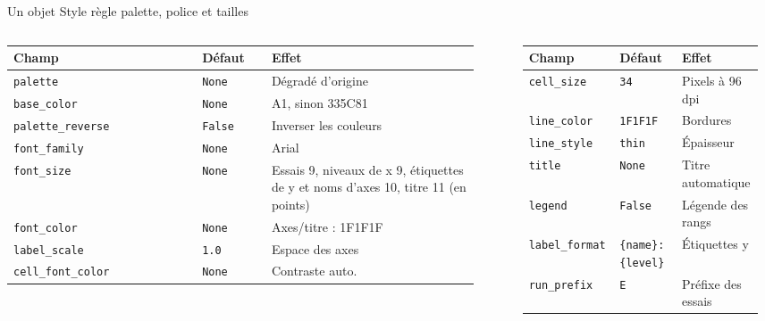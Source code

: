 \begin{frame}[t]{Un objet Style règle palette, police et tailles}
\vfill
{\footnotesize\setlength{\tabcolsep}{2.5pt}
\begin{columns}[T,totalwidth=1.05\textwidth]
\begin{column}{0.49\textwidth}
\begin{tabular}{@{}>{\raggedright\arraybackslash}p{0.38\linewidth}>{\raggedright\arraybackslash}p{0.14\linewidth}>{\raggedright\arraybackslash}p{0.42\linewidth}@{}}
\toprule
\textbf{Champ} & \textbf{Défaut} & \textbf{Effet}\\
\midrule
\texttt{palette} & \texttt{None} & Dégradé d'origine\\
\texttt{base\_color} & \texttt{None} & A1, sinon 335C81\\
\texttt{palette\_reverse} & \texttt{False} & Inverser les couleurs\\
\texttt{font\_family} & \texttt{None} & Arial\\
\texttt{font\_size} & \texttt{None} & Essais 9, niveaux de x 9, étiquettes de y et noms d'axes 10, titre 11 (en points)\\
\texttt{font\_color} & \texttt{None} & Axes/titre : 1F1F1F\\
\texttt{label\_scale} & \texttt{1.0} & Espace des axes\\
\texttt{cell\_font\_color} & \texttt{None} & Contraste auto.\\
\bottomrule
\end{tabular}
\end{column}
\begin{column}{0.49\textwidth}
\begin{tabular}{@{}>{\raggedright\arraybackslash}p{0.35\linewidth}>{\raggedright\arraybackslash}p{0.26\linewidth}>{\raggedright\arraybackslash}p{0.32\linewidth}@{}}
\toprule
\textbf{Champ} & \textbf{Défaut} & \textbf{Effet}\\
\midrule
\texttt{cell\_size} & \texttt{34} & Pixels à 96 dpi\\
\texttt{line\_color} & \texttt{1F1F1F} & Bordures\\
\texttt{line\_style} & \texttt{thin} & Épaisseur\\
\texttt{title} & \texttt{None} & Titre automatique\\
\texttt{legend} & \texttt{False} & Légende des rangs\\
\texttt{label\_format} & \texttt{\{name\}: \{level\}} & Étiquettes y\\
\texttt{run\_prefix} & \texttt{E} & Préfixe des essais\\

\end{tabular}
\end{column}
\end{columns}}
\end{frame}

